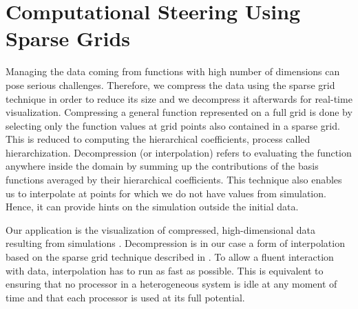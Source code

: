 \section{Computational Steering Using Sparse Grids}



Managing the data coming from functions with high number of dimensions can pose
serious challenges. Therefore, we compress the data using the sparse grid
technique in order to reduce its size and we decompress it afterwards for
real-time visualization. Compressing a general function represented on a full
grid is done by selecting only the function values at grid points also contained
in a sparse grid. This is reduced to computing the hierarchical coefficients,
process called hierarchization. Decompression (or interpolation) refers to
evaluating the function anywhere inside the domain by summing up the
contributions of the basis functions averaged by their hierarchical
coefficients. This technique also enables us to interpolate at points for which
we do not have values from simulation. Hence, it can provide hints on the
simulation outside the initial data.

Our application is the visualization of compressed, high-dimensional data
resulting from simulations \cite{butnaru2011}. Decompression is in our case a
form of interpolation based on the sparse grid technique described in
\cite{bungartz2004}. To allow a fluent interaction with data, interpolation has
to run as fast as possible. This is equivalent to ensuring that no processor in
a heterogeneous system is idle at any moment of time and that each processor is
used at its full potential.




